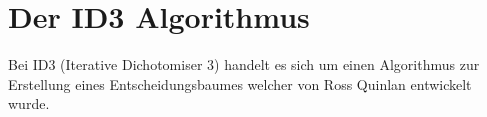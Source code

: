 \chapter{Der ID3 Algorithmus}
\label{id3}
Bei ID3 (Iterative Dichotomiser 3) handelt es sich um einen Algorithmus zur Erstellung eines Entscheidungsbaumes welcher von Ross Quinlan entwickelt wurde. \Autocite{QuinlanID3}




